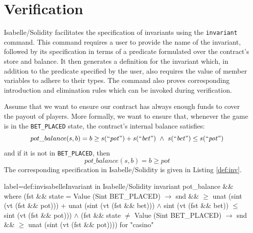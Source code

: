 \documentclass[a4paper,UKenglish,cleveref, autoref, thm-restate]{oasics-v2021}
\begin{document}
%
%

%
%
\section{Verification}
%
%
%
Isabelle/Solidity facilitates the specification of invariants using the \texttt{\color{isarblue}invariant} command.
This command requires a user to provide the name of the invariant, followed by its specification in terms of a predicate formulated over the contract's store and balance.
It then generates a definition for the invariant which, in addition to the predicate specified by the user, also requires the value of member variables to adhere to their types.
The command also proves corresponding  introduction and elimination rules which can be invoked during verification.


	Assume that we want to ensure our contract has always enough funds to cover the payout of players.
  More formally, we want to ensure that, whenever the game is in the \texttt{BET\_PLACED} state, the contract's internal balance satisfies:
	\begin{equation}
	  pot\_balance(s, b)=b \ge s(\text{``$\mathit{pot}$''}) + s(\text{``$\mathit{bet}$''})~\wedge~s(\text{``$\mathit{bet}$''}) \leq s(\text{``$\mathit{pot}$''})
	\end{equation}\label{eq:inv}
  and if it is not in \texttt{BET\_PLACED}, then 
  \begin{equation}
		pot\_balance(s, b)=b \ge pot 
  \end{equation}\label{eq:inv1}
%
The corresponding specification in Isabelle/Solidity is given in Listing \ref{def:inv}.
\begin{code}{label={def:inv}}{isabelle}{Invariant in Isabelle/Solidity
  \hfill{}%
}
invariant pot_balance && where
  (fst && state = Value (Sint BET_PLACED)
    $\longrightarrow$ snd && $\geq$ unat (sint (vt (fst && pot))) 
	               + unat (sint (vt (fst && bet)))
        $\wedge$ sint (vt (fst && bet)) $\leq$ sint (vt (fst && pot))) $\wedge$
  (fst && state $\neq$ Value (Sint BET_PLACED)
    $\longrightarrow$  snd && $\geq$ unat (sint (vt (fst && pot))))
  for "casino"
\end{code}
%
\end{document}
